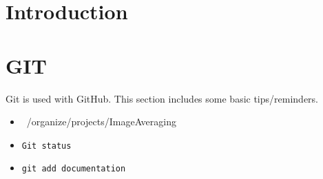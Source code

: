 \documentclass[10pt,a4paper]{report}
\author{Jeroen Keizer}
\begin{document}
\section{Introduction}
\section{GIT}
Git is used with GitHub.
This section includes some basic tips/reminders.
\begin{itemize}
\item ~/organize/projects/ImageAveraging
\item \verb|Git status|
\item \verb|git add documentation|
\end{itemize}
\end{document}
